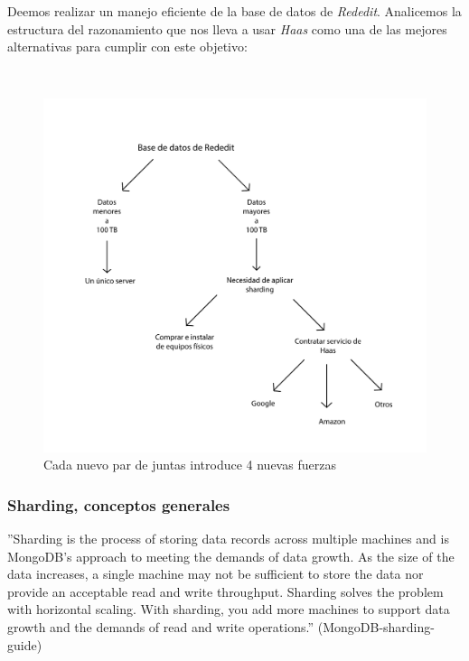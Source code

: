 Deemos realizar un manejo eficiente de la base de datos de \emph{Rededit}. Analicemos la estructura del razonamiento que 
nos lleva a usar \emph{Haas} como una de las mejores alternativas para cumplir con este objetivo:

~

\begin{figure}[!h]
	\begin{center}
		  \includegraphics[keepaspectratio]{imagenes/im_1.pdf}
		  \caption{Cada nuevo par de juntas introduce 4 nuevas fuerzas}
		  \label{fig:contra1}
	\end{center}
\end{figure}
\FloatBarrier

\subsubsection{Sharding, conceptos generales}

''Sharding is the process of storing data records across multiple machines and is MongoDB’s approach to meeting the
demands of data growth. As the size of the data increases, a single machine may not be sufficient to store the data nor
provide an acceptable read and write throughput. Sharding solves the problem with horizontal scaling. With sharding,
you add more machines to support data growth and the demands of read and write operations.'' (MongoDB-sharding-guide)

